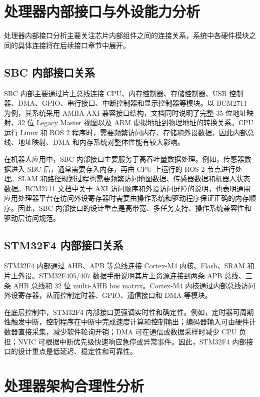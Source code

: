 \documentclass[UTF8,a4paper,12pt]{ctexrep}
\begin{document}
\section{处理器内部接口与外设能力分析}

处理器内部接口分析主要关注芯片内部组件之间的连接关系，系统中各硬件模块之间的具体连接将在后续接口章节中展开。

\subsection{SBC 内部接口关系}

SBC 内部主要通过片上总线连接 CPU、内存控制器、存储控制器、USB 控制器、DMA、GPIO、串行接口、中断控制器和显示控制器等模块。以 BCM2711 为例，其系统采用 AMBA AXI 兼容接口结构，文档同时说明了完整 35 位地址映射、32 位 Legacy Master 视图以及 ARM 虚拟地址到物理地址的转换关系。CPU 运行 Linux 和 ROS 2 程序时，需要频繁访问内存、存储和外设数据，因此内部总线、地址映射、DMA 和内存系统对整体性能有较大影响。

在机器人应用中，SBC 内部接口主要服务于高吞吐量数据处理。例如，传感器数据进入 SBC 后，通常需要存入内存，再由 CPU 上运行的 ROS 2 节点进行处理。SLAM 和路径规划过程也需要频繁访问地图数据、传感器数据和机器人状态数据。BCM2711 文档中关于 AXI 访问顺序和外设访问屏障的说明，也表明通用应用处理器平台在访问外设寄存器时需要由操作系统和驱动程序保证正确的内存顺序。因此，SBC 内部接口的设计重点是高带宽、多任务支持、操作系统兼容性和驱动层访问规范。

\subsection{STM32F4 内部接口关系}

STM32F4 内部通过 AHB、APB 等总线连接 Cortex-M4 内核、Flash、SRAM 和片上外设。STM32F405/407 数据手册说明其片上资源连接到两条 APB 总线、三条 AHB 总线和 32 位 multi-AHB bus matrix。Cortex-M4 内核通过内部总线访问外设寄存器，从而控制定时器、GPIO、通信接口和 DMA 等模块。

在底层控制中，STM32F4 内部接口更强调实时性和确定性。例如，定时器可周期性触发中断，控制程序在中断中完成速度计算和控制输出；编码器输入可由硬件计数器直接采集，减少软件轮询开销；DMA 可在通信或数据采样时减少 CPU 负担；NVIC 可根据中断优先级快速响应急停或异常事件。因此，STM32F4 内部接口的设计重点是低延迟、稳定性和可靠性。

\section{处理器架构合理性分析}
\end{document}
